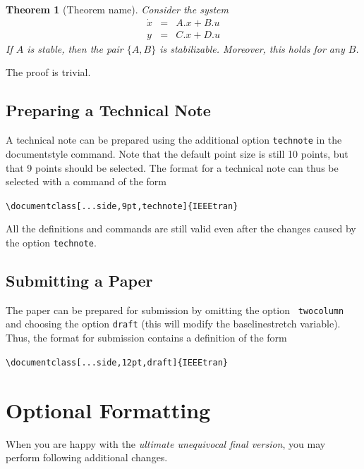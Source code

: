 \documentclass[journal,transmag]{IEEEtran}
\newtheorem{theorem}{Theorem}
\begin{document}
\begin{theorem}[Theorem name]
Consider the system
\begin{equation}
\begin{array}{rrr}
\dot x&=&A.x+B.u\\[2mm]
y&=& C.x+D.u
\end{array}
\end{equation}
If $A$ is stable, then the pair $\{A,B\}$ is stabilizable. Moreover,
this holds for any $B$.
\end{theorem}
\begin{IEEEproof}
    The proof is trivial.
\end{IEEEproof}

\subsection{Preparing a Technical Note}
A technical note can be prepared using the additional option
\verb+technote+ in the documentstyle command. Note that the default
point size is still 10 points, but that 9 points should be selected.
The format for a technical note can thus be selected with a command
of the form
\begin{center}
\verb+\documentclass[...side,9pt,technote]{IEEEtran}+ %
\end{center}
All the definitions and commands are still valid  even after the
changes caused by the option \verb+technote+.

\subsection{Submitting a Paper}
The paper can be prepared for submission by omitting the option {\tt
twocolumn} and choosing the option {\tt draft} (this will modify the
baselinestretch variable).
Thus, the format for submission contains a definition of the form
\begin{center}
\verb+\documentclass[...side,12pt,draft]{IEEEtran}+ %
\end{center}

\section{Optional Formatting}

When you are happy with the {\em ultimate unequivocal final version},
you may perform following additional changes.
\end{document}
